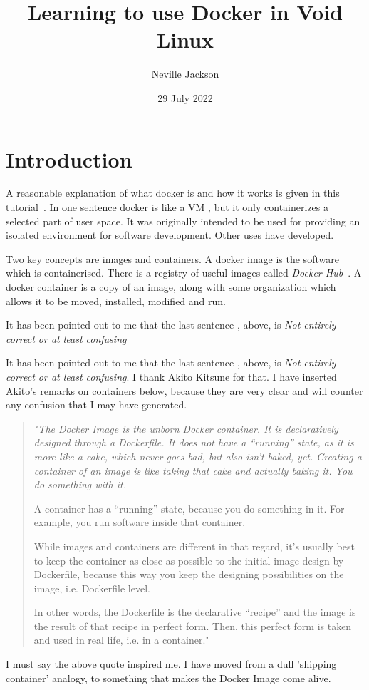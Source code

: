 \documentclass{article}  %
\title{Learning to use Docker in Void Linux}
\author{Neville Jackson}
\date{29 July 2022}
\begin{document}
 

\maketitle      

\section{Introduction} 
A reasonable explanation of what docker is and how it works is given in this tutorial~\cite{dock:00}. In one sentence docker is like a VM , but it only containerizes a selected part of user space. It was originally intended to be used for providing an isolated environment for software development. Other uses have developed. 

Two key concepts are images and containers. A docker image is the software which is containerised. There is a registry of useful images called {\em Docker Hub}~\cite{dock:02}. A docker container is  a copy of an image, along with some organization which  allows it to be moved, installed, modified and run.

It has been pointed out to me that the last sentence , above, is {\em Not entirely correct or at least confusing}

It has been pointed out to me that the last sentence , above, is {\em Not entirely correct or at least confusing}. I thank Akito Kitsune for that. I have inserted Akito's remarks on containers below, because they are very clear and will counter any confusion that I may have generated.
\begin{quotation}
\em "The Docker Image is the unborn Docker container. It is declaratively designed through a Dockerfile.
It does not have a “running” state, as it is more like a cake, which never goes bad, but also isn’t baked, yet.
Creating a container of an image is like taking that cake and actually baking it. You do something with it.

A container has a “running” state, because you do something in it. For example, you run software inside that container.

While images and containers are different in that regard, it’s usually best to keep the container as close as possible to the initial image design by Dockerfile, because this way you keep the designing possibilities on the image, i.e. Dockerfile level.

In other words, the Dockerfile is the declarative “recipe” and the image is the result of that recipe in perfect form.
Then, this perfect form is taken and used in real life, i.e. in a container."
\end{quotation}
I must say the above quote inspired me. I have moved from a dull 'shipping container' analogy, to something that makes the Docker Image come alive.
\end{document}
